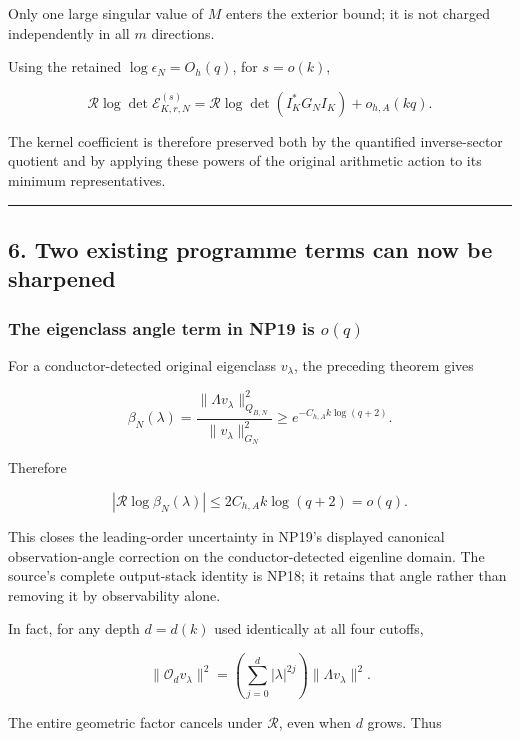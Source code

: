 \documentclass[11pt]{article}
\begin{document}
Only one large singular value of \(M\) enters the exterior bound; it is not charged independently in all \(m\) directions.

Using the retained \(\log\epsilon_N=O_h(q)\), for \(s=o(k)\),

\[
\boxed{
\mathcal R\log\det\mathcal E^{(s)}_{K,r,N}
=
\mathcal R\log\det(I_K^*G_NI_K)+o_{h,A}(kq).
}
\tag{40}
\]

The kernel coefficient is therefore preserved both by the quantified inverse-sector quotient and by applying these powers of the original arithmetic action to its minimum representatives.

\begin{center}\rule{0.5\linewidth}{0.5pt}\end{center}

\subsection{6. Two existing programme terms can now be sharpened}\label{two-existing-programme-terms-can-now-be-sharpened}

\subsubsection{\texorpdfstring{The eigenclass angle term in NP19 is \(o(q)\)}{The eigenclass angle term in NP19 is o(q)}}\label{the-eigenclass-angle-term-in-np19-is-oq}

For a conductor-detected original eigenclass \(v_\lambda\), the preceding theorem gives

\[
\beta_N(\lambda)
=
\frac{\|\Lambda v_\lambda\|_{Q_{B,N}}^2}
{\|v_\lambda\|_{G_N}^2}
\ge e^{-C_{h,A}k\log(q+2)}.
\]

Therefore

\[
\boxed{
|\mathcal R\log\beta_N(\lambda)|
\le2C_{h,A}k\log(q+2)=o(q).
}
\tag{41}
\]

This closes the leading-order uncertainty in NP19's displayed canonical observation-angle correction on the conductor-detected eigenline domain. The source's complete output-stack identity is NP18; it retains that angle rather than removing it by observability alone.

In fact, for any depth \(d=d(k)\) used identically at all four cutoffs,

\[
\|\mathcal O_dv_\lambda\|^2
=
\left(\sum_{j=0}^{d}|\lambda|^{2j}\right)
\|\Lambda v_\lambda\|^2.
\]

The entire geometric factor cancels under \(\mathcal R\), even when \(d\) grows. Thus
\end{document}
